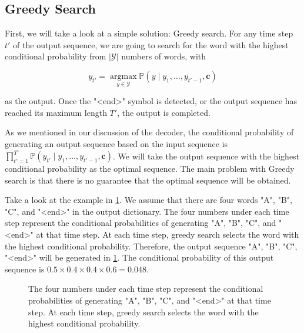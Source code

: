 \subsection{Greedy Search}\label{subsec:greedy-search}

First, we will take a look at a simple solution: Greedy search. For any time step $t'$ of the output sequence, we are going to search for the word with the highest conditional probability from $|\mathcal{Y}|$ numbers of words, with

$$y_{t'} = \operatorname*{argmax}_{y \in \mathcal{Y}} \mathbb{P}(y \mid y_1, \ldots, y_{t'-1}, \boldsymbol{c})$$

as the output.  Once the "<end>" symbol is detected, or the output sequence has reached its maximum length $T'$, the output is completed.

As we mentioned in our discussion of the decoder, the conditional probability of generating an output sequence based on the input sequence is $\prod_{t'=1}^{T'} \mathbb{P}(y_{t'} \mid y_1, \ldots, y_{t'-1}, \boldsymbol{c})$. We will take the output sequence with the highest conditional probability as the optimal sequence. The main problem with Greedy search is that there is no guarantee that the optimal sequence will be obtained.

Take a look at the example in \cref{fig:s2s_prob1}. We assume that there are four words "A", "B", "C", and "<end>" in the output dictionary.  The four numbers under each time step represent the conditional probabilities of generating "A", "B", "C", and "<end>" at that time step.  At each time step, greedy search selects the word with the highest conditional probability. Therefore, the output sequence "A", "B", "C", "<end>" will be generated in \cref{fig:s2s_prob1}. The conditional probability of this output sequence is $0.5\times0.4\times0.4\times0.6 = 0.048$.

\begin{figure}[hpt]
    \centering
    
    \caption{The four numbers under each time step represent the conditional probabilities of generating "A", "B", "C", and "<end>" at that time step. At each time step, greedy search selects the word with the highest conditional probability.}
    \label{fig:s2s_prob1}
\end{figure}


